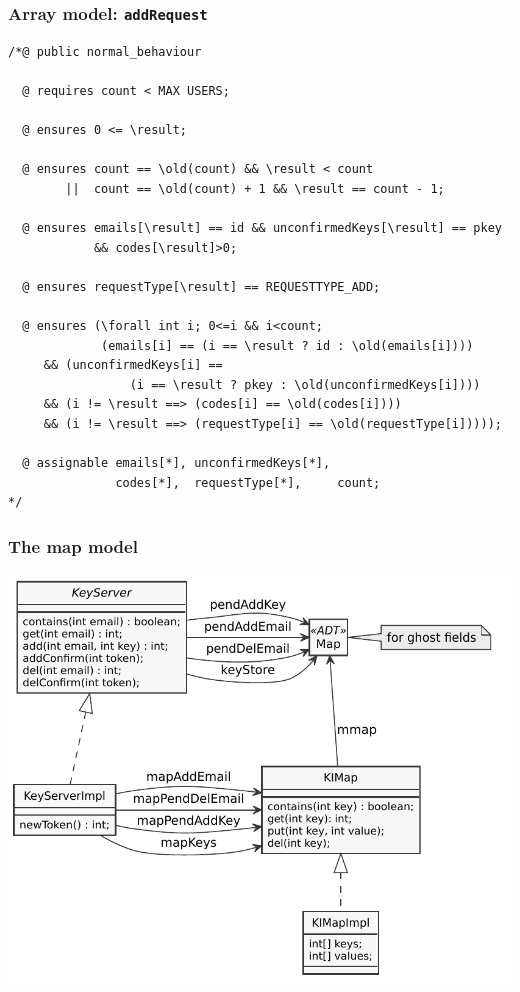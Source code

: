 \documentclass{beamer}
\begin{document}
\begin{frame}[fragile]
    \frametitle{Array model: \texttt{addRequest}}
\begin{lstlisting}
/*@ public normal_behaviour

  @ requires count < MAX USERS;
  
  @ ensures 0 <= \result;

  @ ensures count == \old(count) && \result < count
        ||  count == \old(count) + 1 && \result == count - 1;

  @ ensures emails[\result] == id && unconfirmedKeys[\result] == pkey
            && codes[\result]>0;

  @ ensures requestType[\result] == REQUESTTYPE_ADD;

  @ ensures (\forall int i; 0<=i && i<count;
             (emails[i] == (i == \result ? id : \old(emails[i])))
     && (unconfirmedKeys[i] ==
                 (i == \result ? pkey : \old(unconfirmedKeys[i])))
     && (i != \result ==> (codes[i] == \old(codes[i])))
     && (i != \result ==> (requestType[i] == \old(requestType[i]))));

  @ assignable emails[*], unconfirmedKeys[*],
               codes[*],  requestType[*],     count;
*/
\end{lstlisting}
\end{frame}



\lstset {
  basicstyle=\footnotesize\ttfamily,
}

\begin{frame}
  \frametitle{The map model}
  \centering  \includegraphics[height=.9\textheight]{imap}
\end{frame}
\end{document}
